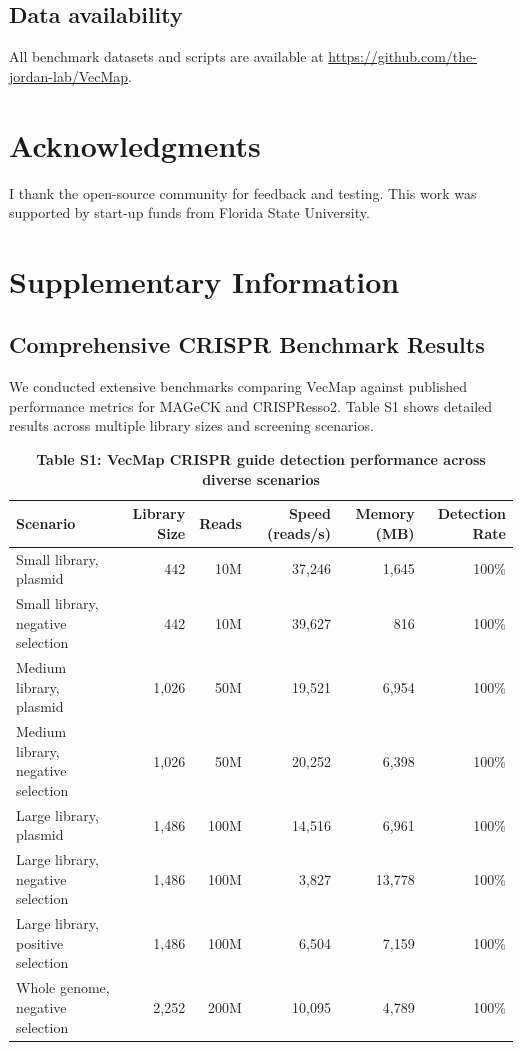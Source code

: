 \documentclass[12pt]{article}
\begin{document}
\subsection{Data availability}

All benchmark datasets and scripts are available at \url{https://github.com/the-jordan-lab/VecMap}.

\section{Acknowledgments}

I thank the open-source community for feedback and testing. This work was supported by start-up funds from Florida State University.




\newpage
\section*{Supplementary Information}

\subsection*{Comprehensive CRISPR Benchmark Results}

We conducted extensive benchmarks comparing VecMap against published performance metrics for MAGeCK and CRISPResso2. Table S1 shows detailed results across multiple library sizes and screening scenarios.

\begin{table}[H]
\centering
\caption{\textbf{Table S1: VecMap CRISPR guide detection performance across diverse scenarios}}
\begin{tabular}{lrrrrr}
\toprule
\textbf{Scenario} & \textbf{Library Size} & \textbf{Reads} & \textbf{Speed (reads/s)} & \textbf{Memory (MB)} & \textbf{Detection Rate} \\
\midrule
Small library, plasmid & 442 & 10M & 37,246 & 1,645 & 100\% \\
Small library, negative selection & 442 & 10M & 39,627 & 816 & 100\% \\
Medium library, plasmid & 1,026 & 50M & 19,521 & 6,954 & 100\% \\
Medium library, negative selection & 1,026 & 50M & 20,252 & 6,398 & 100\% \\
Large library, plasmid & 1,486 & 100M & 14,516 & 6,961 & 100\% \\
Large library, negative selection & 1,486 & 100M & 3,827 & 13,778 & 100\% \\
Large library, positive selection & 1,486 & 100M & 6,504 & 7,159 & 100\% \\
Whole genome, negative selection & 2,252 & 200M & 10,095 & 4,789 & 100\% \\
\bottomrule
\end{tabular}
\end{table}
\end{document}
